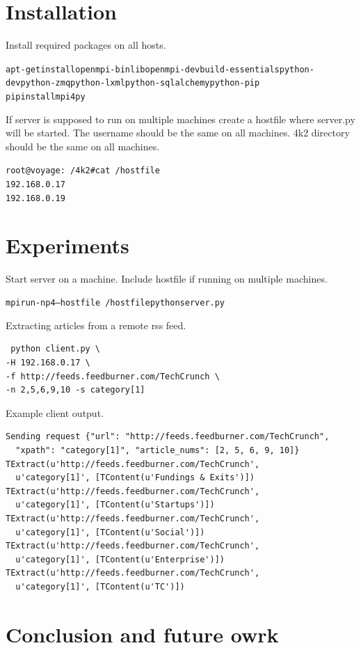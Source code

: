\documentclass[a4paper,12pt]{article}
\begin{document}
\section{Installation}
Install required packages on all hosts.
\begin{alltt}
apt-get install openmpi-bin libopenmpi-dev build-essentials python-dev python-zmq python-lxml python-sqlalchemy python-pip
pip install mpi4py
\end{alltt}

If server is supposed to run on multiple machines create a hostfile where server.py will be started.
The username should be the same on all machines. 4k2 directory should be the same on all machines.
\begin{alltt}
root@voyage:~/4k2# cat ~/hostfile
192.168.0.17
192.168.0.19
\end{alltt}



\section{Experiments}
Start server on a machine. Include hostfile if running on multiple machines.
\begin{alltt}
mpirun -np 4 --hostfile ~/hostfile python server.py
\end{alltt}

Extracting articles from a remote rss feed.
\begin{verbatim}
 python client.py \
-H 192.168.0.17 \
-f http://feeds.feedburner.com/TechCrunch \
-n 2,5,6,9,10 -s category[1]
\end{verbatim}

Example client output. 
\begin{verbatim}
Sending request {"url": "http://feeds.feedburner.com/TechCrunch",
  "xpath": "category[1]", "article_nums": [2, 5, 6, 9, 10]}
TExtract(u'http://feeds.feedburner.com/TechCrunch', 
  u'category[1]', [TContent(u'Fundings & Exits')])
TExtract(u'http://feeds.feedburner.com/TechCrunch', 
  u'category[1]', [TContent(u'Startups')])
TExtract(u'http://feeds.feedburner.com/TechCrunch', 
  u'category[1]', [TContent(u'Social')])
TExtract(u'http://feeds.feedburner.com/TechCrunch', 
  u'category[1]', [TContent(u'Enterprise')])
TExtract(u'http://feeds.feedburner.com/TechCrunch', 
  u'category[1]', [TContent(u'TC')])
\end{verbatim}



\section{Conclusion and future owrk}
\end{document}
